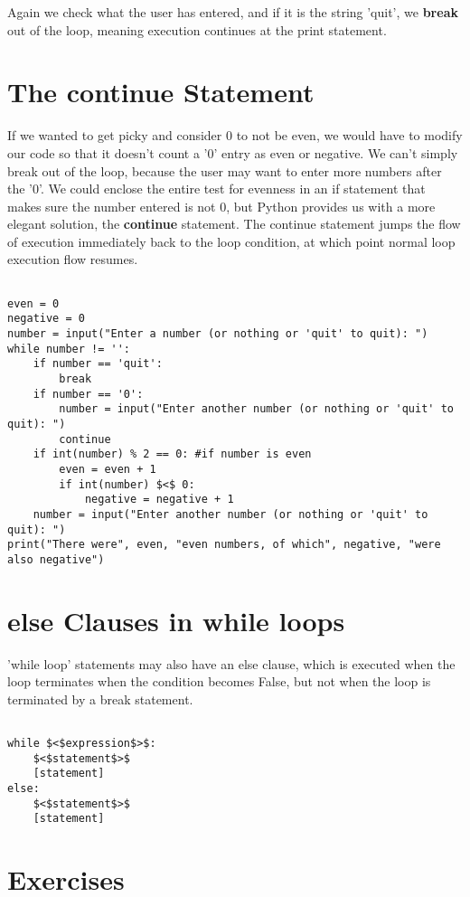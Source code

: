 Again we check what the user has entered, and if it is the string   'quit', we \textbf{break} out of the loop, meaning execution   continues at the print statement.

\section{The continue Statement}

If we wanted to get picky and consider 0 to not be even, we would   have to modify our code so that it doesn't count a '0' entry as even or   negative. We can't simply break out of the loop, because the user may   want to enter more numbers after the '0'. We could enclose the entire   test for evenness in an if statement that makes sure the number entered   is not 0, but Python provides us with a more elegant solution, the \textbf{continue} statement.   The continue statement jumps the flow of execution immediately back to   the loop condition, at which point normal loop execution flow   resumes.
\begin{lstlisting}

even = 0
negative = 0
number = input("Enter a number (or nothing or 'quit' to quit): ")
while number != '':
    if number == 'quit':
        break
    if number == '0':
        number = input("Enter another number (or nothing or 'quit' to quit): ")
        continue
    if int(number) % 2 == 0: #if number is even
        even = even + 1
        if int(number) $<$ 0:
            negative = negative + 1
    number = input("Enter another number (or nothing or 'quit' to quit): ")
print("There were", even, "even numbers, of which", negative, "were also negative")
\end{lstlisting}

\section{else Clauses in while loops}

'while loop' statements may also have an else clause, which is   executed when the loop terminates when the condition becomes False, but   not when the loop is terminated by a break statement.    
\begin{lstlisting}

while $<$expression$>$:
    $<$statement$>$
    [statement]
else:
    $<$statement$>$
    [statement]
\end{lstlisting}

\section{Exercises}

